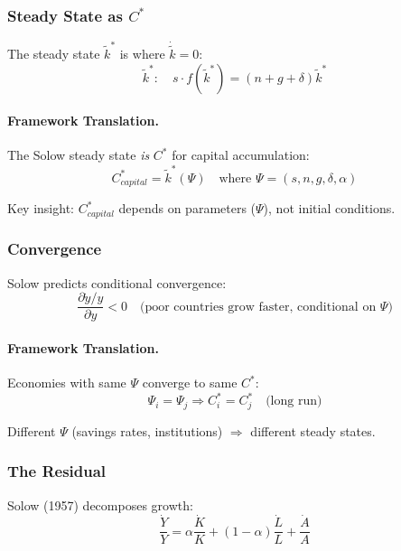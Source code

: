 \subsubsection{Steady State as $C^*$}

The steady state $\tilde{k}^*$ is where $\dot{\tilde{k}} = 0$:
\begin{equation}
\boxed{
\tilde{k}^* : \quad s \cdot f(\tilde{k}^*) = (n + g + \delta) \tilde{k}^*
}
\label{eq:solow-steady}
\end{equation}

\paragraph{Framework Translation.}
The Solow steady state \textit{is} $C^*$ for capital accumulation:
\begin{equation}
C^*_{capital} = \tilde{k}^*(\Psi) \quad \text{where } \Psi = (s, n, g, \delta, \alpha)
\end{equation}

Key insight: $C^*_{capital}$ depends on parameters ($\Psi$), not initial conditions.

\subsubsection{Convergence}

Solow predicts conditional convergence:
\begin{equation}
\frac{\partial \dot{y}/y}{\partial y} < 0 \quad \text{(poor countries grow faster, conditional on } \Psi\text{)}
\end{equation}

\paragraph{Framework Translation.}
Economies with same $\Psi$ converge to same $C^*$:
\begin{equation}
\Psi_i = \Psi_j \Rightarrow C^*_i = C^*_j \quad \text{(long run)}
\end{equation}

Different $\Psi$ (savings rates, institutions) $\Rightarrow$ different steady states.

\subsubsection{The Residual}

Solow (1957) decomposes growth:
\begin{equation}
\boxed{
\frac{\dot{Y}}{Y} = \alpha \frac{\dot{K}}{K} + (1-\alpha) \frac{\dot{L}}{L} + \frac{\dot{A}}{A}
}
\label{eq:solow-accounting}
\end{equation}

